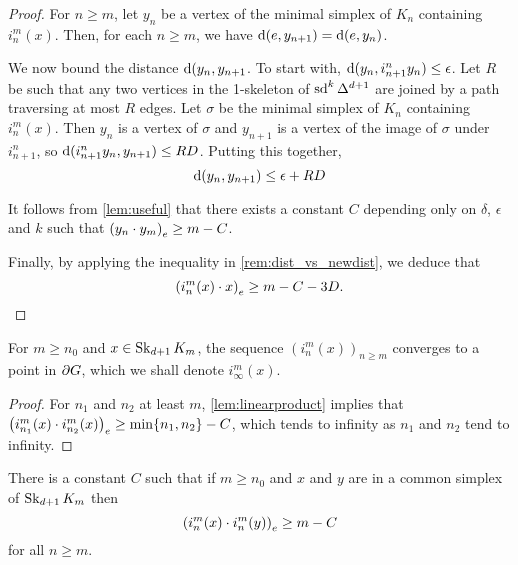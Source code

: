 \documentclass[a4paper]{article}
\begin{document}
\begin{proof}
  For $n \geq m$, let $y_n$ be a vertex of the minimal simplex of $K_n$
  containing $i^m_n(x)$. Then, for each $n \geq m$, we have $\dist(e, y_{n+1})
  = \dist(e, y_n)$. 

  We now bound the distance $\dist(y_n, y_{n+1}$. To start with, $\dist(y_n,
  i^n_{n+1} y_n) \leq \epsilon$. Let $R$ be such that any two vertices in the
  1-skeleton of $\sd^k \Delta^{d+1}$ are joined by a path traversing at most
  $R$ edges. Let $\sigma$ be the minimal simplex of $K_n$ containing
  $i^m_n(x)$. Then $y_n$ is a vertex of $\sigma$ and $y_{n+1}$ is a vertex of
  the image of $\sigma$ under $i^n_{n+1}$, so $\dist(i^n_{n+1} y_n, y_{n+1})
  \leq RD$.  Putting this together,
  \begin{equation*}
      \dist(y_n, y_{n+1}) \leq \epsilon + RD
  \end{equation*}

  It follows from \cref{lem:useful} that there exists a constant $C$ depending
  only on $\delta$, $\epsilon$ and $k$ such that $\gromov{e}{y_n}{y_m} \geq m -
  C$.

  Finally, by applying the inequality in \cref{rem:dist_vs_newdist}, we deduce
  that
  \begin{equation*}
      \gromov{e}{i^m_n(x)}{x} \geq m - C - 3D.\qedhere
  \end{equation*}
\end{proof}

\begin{corollary}
  For $m \geq n_0$ and $x \in \Skel_{d+1} K_m$, the sequence
  $(i^m_n(x))_{n\geq m}$ converges to a point in $\boundary G$, which we shall
  denote $i^m_\infty(x)$.
\end{corollary}

\begin{proof}
  For $n_1$ and $n_2$ at least $m$, \cref{lem:linearproduct} implies that
  $\gromov{e}{i^m_{n_1}(x)}{i^m_{n_2}(x)} \geq \min\{n_1,n_2\} - C$, which
  tends to infinity as $n_1$ and $n_2$ tend to infinity.
\end{proof}

\begin{lemma}\label{lem:simplexproduct}
  There is a constant $C$ such that if $m \geq n_0$ and $x$ and $y$ are in a
  common simplex of $\Skel_{d+1} K_m$ then
  \begin{equation*}
    \gromov{e}{i^m_n(x)}{i^m_n(y)} \geq m - C
  \end{equation*}
  for all $n\geq m$.
\end{lemma}
\end{document}
